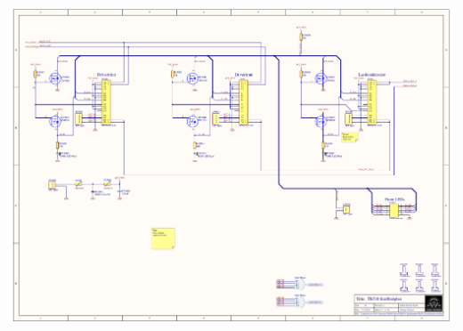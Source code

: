 \includegraphics[page=7,angle=270,height=\textheight,width=\textwidth,keepaspectratio]{TK530_Kraftbakplan.PDF}
%


